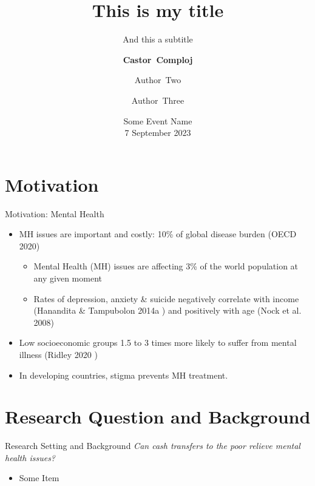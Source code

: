 \documentclass[handout] %
{beamer}
\title{This is my title}
\subtitle{And this a subtitle}
\author[Castor Comploj (nameInFooter)%
] %
{\textbf{Castor~Comploj}\inst{1} \and Author~Two\inst{1,2} \and Author~Three\inst{1,3,4}}
\institute[University of Groningen] %
{
  \inst{1}%
  University of Groningen
  \
  \inst{2}%
  Institute 2\\
  \
  \inst{3}
  Institute 3 
  \ 
  \inst{4}
  Institute 4
}
\date{Some Event Name \\ 7 September 2023} %
\begin{document}
\begin{frame}[plain]
\titlepage 
\end{frame}





\section{Motivation}
\begin{frame}{Motivation: Mental Health}\label{label1}
\begin{itemize}
    \item MH issues are important 
    \pause
    and costly: 10\% of global disease burden (OECD 2020)
    \pause
    \begin{itemize}
    \item Mental Health (MH) issues are affecting 3\% of the world population at any given moment%
    \pause
    \item Rates of depression, anxiety \& suicide negatively correlate with income (Hanandita \& Tampubolon 2014a%
    )  
    \pause 
    and positively with age (Nock et al. 2008) 
    \pause        
    \end{itemize}
    \item Low socioeconomic groups 1.5 to 3 times more likely to suffer from mental illness (Ridley 2020%
    ) 
    \pause
    \item In developing countries, stigma prevents MH treatment. 
\end{itemize}
\end{frame}

\section{Research Question and %
Background} 
\begin{frame}{Research Setting and %
Background}
\textit{Can cash transfers to the poor relieve mental health issues?} 
\pause
\begin{itemize}
    \item Some Item
\end{itemize}
\end{frame}
\end{document}
